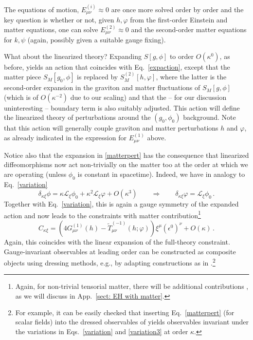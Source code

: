 \documentclass[]{jkpaper}
\theoremstyle{plain}
\theoremstyle{definition}
\begin{document}
The equations of motion, $E^{(i)}_{\mu \nu}\approx0$ are once more solved order by order and the key question is whether or not, given $h,\varphi$ from the first-order Einstein and matter equations,  one can solve $E^{(2)}_{\mu \nu}\approx0$ and the second-order matter equations for $k,\psi$ (again, possibly given a suitable gauge fixing).

What about the linearized theory? Expanding $S[g,\phi]$ to order $O(\kappa^0)$, as before, yields an action that coincides with Eq.~\eqref{expaction}, except that the matter piece $S_M[g_0,\phi]$ is replaced by $S_M^{(2)}[h,\varphi]$, where the latter is the second-order expansion in the graviton and matter fluctuations of $S_M[g,\phi]$ (which is of $O(\kappa^{-2})$ due to our scaling) and that the -- for our discussion uninteresting -- boundary term is also suitably adjusted. This action will define the linearized theory of perturbations around the $(g_0,\phi_0)$ background. Note that this action will generally couple graviton and matter perturbations $h$ and $\varphi$, as already indicated in the expression for $E^{(1)}_{\mu \nu}$ above.

Notice also that the expansion in \eqref{matterpert} has the consequence that linearized diffeomorphisms now act non-trivially on the matter too at the order at which we are operating (unless $\phi_0$ is constant in spacetime). Indeed, we have in analogy to Eq.~\eqref{variation}
\begin{equation}\label{variation3}
\delta_{\kappa\xi}\phi=\kappa\mathcal L_\xi\phi_0+\kappa^2\mathcal L_\xi\varphi+O(\kappa^3)\qquad\Rightarrow\qquad \delta_{\kappa\xi}\varphi = \mathcal L_\xi\phi_0\,.
\end{equation}
Together with Eq.~\eqref{variation}, this is again a gauge symmetry of the expanded action and now leads to the constraints with matter contribution\footnote{Again, for non-trivial tensorial matter, there will be additional contributions \cite{Seifert:2006kv}, as we will discuss in App.~\ref{sect: EH with matter}.}
\begin{equation}\label{lincon2}
    C_{\kappa\xi}=\left(4G_{\mu \nu}^{(1)}(h)-\tilde{T}^{(-1)}_{\mu \nu}(h;\varphi)\right)\xi^\mu(\epsilon^0)^\nu+O(\kappa)\,.
\end{equation}
Again, this coincides with the linear expansion of the full-theory constraint. Gauge-invariant observables at leading order can be constructed as composite objects using dressing methods, e.g., by adapting constructions as in \cite{Donnelly:2015hta,Donnelly:2016rvo,Giddings:2018umg,Giddings:2022hba,Frob:2022ciq,Frob:2023gng}.\footnote{For example, it can be easily checked that inserting Eq.~\eqref{matterpert} (for scalar fields) into the dressed observables of \cite{Donnelly:2015hta,Donnelly:2016rvo,Giddings:2018umg} yields observables invariant under the variations in Eqs.~\eqref{variation} and \eqref{variation3} at order $\kappa$. }
\end{document}
